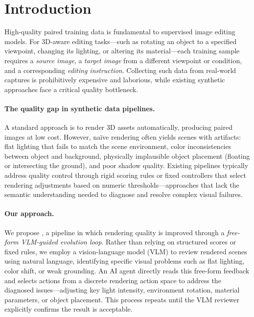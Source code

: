 \section{Introduction}
\label{sec:intro}

High-quality paired training data is fundamental to supervised image editing models.
For 3D-aware editing tasks---such as rotating an object to a specified viewpoint,
changing its lighting, or altering its material---each training sample requires
a \emph{source image}, a \emph{target image} from a different viewpoint or condition,
and a corresponding \emph{editing instruction}.
Collecting such data from real-world captures is prohibitively expensive and laborious,
while existing synthetic approaches face a critical quality bottleneck.

\paragraph{The quality gap in synthetic data pipelines.}
A standard approach is to render 3D assets automatically, producing paired images at low cost.
However, na\"{i}ve rendering often yields scenes with artifacts:
flat lighting that fails to match the scene environment,
color inconsistencies between object and background,
physically implausible object placement (floating or intersecting the ground),
and poor shadow quality.
Existing pipelines typically address quality control through rigid scoring rules or
fixed controllers that select rendering adjustments based on numeric thresholds---approaches
that lack the semantic understanding needed to diagnose and resolve complex visual failures.

\paragraph{Our approach.}
We propose \aris{}, a pipeline in which rendering quality is improved through
a \emph{free-form VLM-guided evolution loop}.
Rather than relying on structured scores or fixed rules,
we employ a vision-language model (VLM) to review rendered scenes using natural language,
identifying specific visual problems such as flat lighting, color shift, or weak grounding.
An AI agent directly reads this free-form feedback and selects actions from a discrete
rendering action space to address the diagnosed issues---adjusting key light intensity,
environment rotation, material parameters, or object placement.
This process repeats until the VLM reviewer explicitly confirms the result is acceptable.

